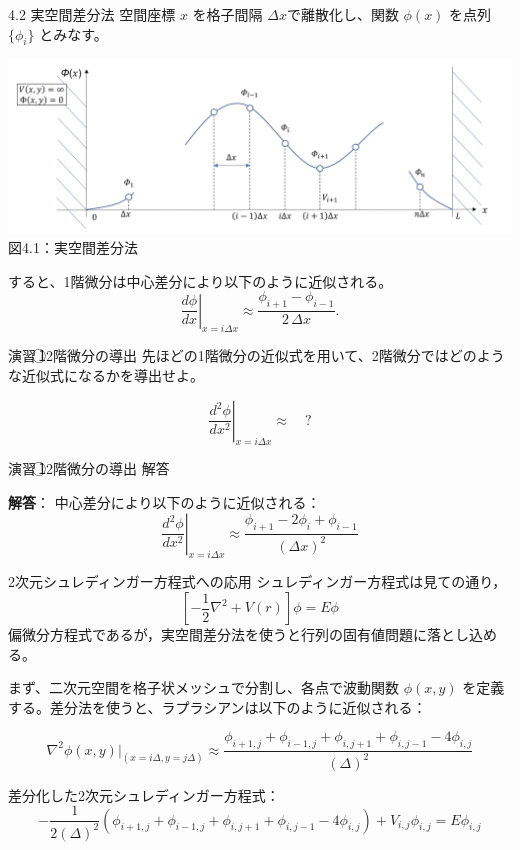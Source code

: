 \documentclass{beamer}
\begin{document}
  \begin{frame}{4.2 実空間差分法}
    空間座標 $x$ を格子間隔 $\Delta x$で離散化し、関数 $\phi(x)$ を点列 $\{\phi_i\}$ とみなす。
    
    
    \begin{center}
      \includegraphics[width=1.1\linewidth]{images/一次元.png} \\
      図4.1：実空間差分法
    \end{center}
    
    すると、1階微分は中心差分により以下のように近似される。
    $$
    \left.\frac{d\phi}{dx}\right|_{x = i\Delta x}
    \approx \frac{\phi_{i+1} - \phi_{i-1}}{2\,\Delta x}.
    $$
    \end{frame}
    
    \begin{frame}{演習\,\textcircled{1}\quad 2階微分の導出}
    先ほどの1階微分の近似式を用いて、2階微分ではどのような近似式になるかを導出せよ。
    
    \bigskip
    $$
    \left. \frac{d^2 \phi}{dx^2} \right|_{x = i\Delta x}
    \approx \quad ?
    $$

    \end{frame}

    \begin{frame}{演習\,\textcircled{1}\quad 2階微分の導出 解答}

      
      \bigskip
      
      \textbf{解答}：
      中心差分により以下のように近似される：
      $$
      \left. \frac{d^2 \phi}{dx^2} \right|_{x = i\Delta x}
      \approx \frac{\phi_{i+1} - 2\phi_i + \phi_{i-1}}{(\Delta x)^2}
      $$
      \end{frame}

  \begin{frame}{2次元シュレディンガー方程式への応用}
    シュレディンガー方程式は見ての通り，
    $$
    \left[ -\frac{1}{2} \nabla^2 + V(r) \right] \phi = E \phi
    $$
    偏微分方程式であるが，実空間差分法を使うと行列の固有値問題に落とし込める。
    
    まず、二次元空間を格子状メッシュで分割し、各点で波動関数 $\phi(x,y)$ を定義する。差分法を使うと、ラプラシアンは以下のように近似される：
    
    $$
    \nabla^2 \phi(x,y)\big|_{(x=i\Delta,y=j \Delta)} 
    \approx \frac{\phi_{i+1,j} + \phi_{i-1,j} + \phi_{i,j+1} + \phi_{i,j-1} - 4\phi_{i,j}}{(\Delta )^2}
    $$
    
    差分化した2次元シュレディンガー方程式：
    $$
    -\frac{1}{2(\Delta )^2} (\phi_{i+1,j} + \phi_{i-1,j} + \phi_{i,j+1} + \phi_{i,j-1} - 4\phi_{i,j} ) + V_{i,j} \phi_{i,j} = E \phi_{i,j}
    $$
    \end{frame}
    
\end{document}

